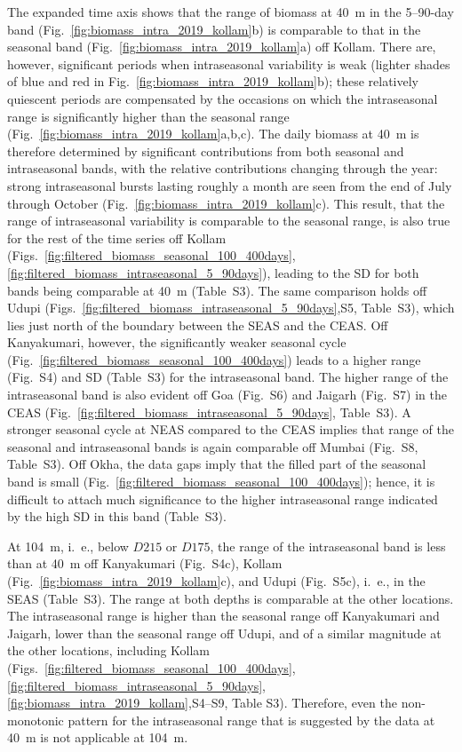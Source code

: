 \documentclass[authoryear,review,11pt]{elsarticle}
\begin{document}
The expanded time axis shows that the range of biomass at 40~m in the 5--90-day band (Fig.~\ref{fig:biomass_intra_2019_kollam}b) is comparable to that in the seasonal band (Fig.~\ref{fig:biomass_intra_2019_kollam}a) off Kollam.  There are, however, significant periods when intraseasonal variability is weak (lighter shades of blue and red in Fig.~\ref{fig:biomass_intra_2019_kollam}b); these relatively quiescent periods are compensated by the occasions on which the intraseasonal range is significantly higher than the seasonal range (Fig.~\ref{fig:biomass_intra_2019_kollam}a,b,c). The daily biomass at 40~m is therefore determined by significant contributions from both seasonal and intraseasonal bands, with the relative contributions changing through the year: strong intraseasonal bursts lasting roughly a month are seen from the end of July through October (Fig.~\ref{fig:biomass_intra_2019_kollam}c). This result, that the range of intraseasonal variability is comparable to the seasonal range, is also true for the rest of the time series off Kollam (Figs.~\ref{fig:filtered_biomass_seasonal_100_400days},\ref{fig:filtered_biomass_intraseasonal_5_90days}), leading to the SD for both bands being comparable at 40~m (Table~S3).  The same comparison holds off Udupi (Figs.~\ref{fig:filtered_biomass_intraseasonal_5_90days},S5, Table~S3), which lies just north of the boundary between the SEAS and the CEAS.  Off Kanyakumari, however, the significantly weaker seasonal cycle (Fig.~\ref{fig:filtered_biomass_seasonal_100_400days}) leads to a higher range (Fig.~S4) and SD (Table~S3) for the intraseasonal band.  The higher range of the intraseasonal band is also evident off Goa (Fig.~S6) and Jaigarh (Fig.~S7) in the CEAS (Fig.~\ref{fig:filtered_biomass_intraseasonal_5_90days}, Table~S3). A stronger seasonal cycle at NEAS compared to the CEAS implies that range of the seasonal and intraseasonal bands is again comparable off Mumbai (Fig.~S8, Table~S3).  Off Okha, the data gaps imply that the filled part of the seasonal band is small (Fig.~\ref{fig:filtered_biomass_seasonal_100_400days}); hence, it is difficult to attach much significance to the higher intraseasonal range indicated by the high SD in this band (Table~S3).

At 104~m, i.~e., below $D215$ or $D175$, the range of the intraseasonal band is less than at 40~m off Kanyakumari (Fig.~S4c), Kollam (Fig.~\ref{fig:biomass_intra_2019_kollam}c), and Udupi (Fig.~S5c), i.~e., in the SEAS (Table~S3).  The range at both depths is comparable at the other locations. The intraseasonal range is higher than the seasonal range off Kanyakumari and Jaigarh, lower than the seasonal range off Udupi, and of a similar magnitude at the other locations, including Kollam (Figs.~\ref{fig:filtered_biomass_seasonal_100_400days},\ref{fig:filtered_biomass_intraseasonal_5_90days},\ref{fig:biomass_intra_2019_kollam},S4--S9, Table S3). Therefore, even the non-monotonic pattern for the intraseasonal range that is suggested by the data at 40~m is not applicable at 104~m.
\end{document}
